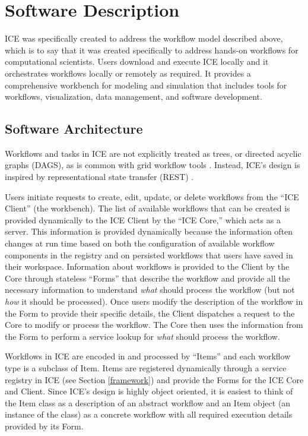 \section{Software Description}\label{software-description}

ICE was specifically created to address the workflow model described
above, which is to say that it was created specifically to address
hands-on workflows for computational scientists. Users download and
execute ICE locally and it orchestrates workflows locally or remotely as
required. It provides a comprehensive workbench for modeling and
simulation that includes tools for workflows, visualization, data
management, and software development.

\subsection{Software Architecture}\label{software-architecture}

Workflows and tasks in ICE are not explicitly treated as trees, or
directed acyclic graphs (DAGS), as is common with grid workflow tools
\cite{yu_taxonomy_2005}. Instead, ICE's design is inspired by representational
state transfer (REST) \cite{fielding_architectural_2000}.

Users initiate requests to create, edit, update, or delete workflows from
the ``ICE Client'' (the workbench). The list of available workflows
that can be created is provided dynamically to the ICE Client by
the ``ICE Core,'' which acts as a server. This information is
provided dynamically because the information often changes at run time based on 
both the configuration of available workflow components in the registry and on
persisted workflows that users have saved in their workspace.
Information about workflows is provided to the Client by the Core
through stateless ``Forms'' that describe the workflow and provide
all the necessary information to understand \emph{what} should process
the workflow (but not \emph{how} it should be processed). Once users
modify the description of the workflow in the Form to provide their
specific details, the Client dispatches a request to the Core to modify
or process the workflow. The Core then uses the information from the Form
to perform a service lookup for \emph{what} should process the workflow.

Workflows in ICE are encoded in and processed by ``Items'' and each
workflow type is a subclass of Item. Items are registered dynamically
through a service registry in ICE (see Section \ref{framework}) and
provide the Forms for the ICE Core and Client. Since ICE's design is
highly object oriented, it is easiest to think of the Item class as a
description of an abstract workflow and an Item object (an instance of
the class) as a concrete workflow with all required execution details
provided by its Form.

